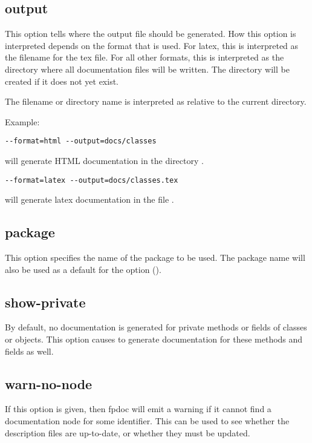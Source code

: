 \subsection{output}
\label{suse:output}
This option tells  \fpdoc where the output file should be generated. 
How this option is interpreted depends on the format that is used. 
For latex, this is interpreted as the filename for the tex file. 
For all other formats, this is interpreted as the directory where all 
documentation files will be written. The directory will be created if 
it does not yet exist.

The filename or directory name is interpreted as relative to the current
directory.

Example:
\begin{verbatim}
--format=html --output=docs/classes
\end{verbatim}
will generate HTML documentation in the directory .
\begin{verbatim}
--format=latex --output=docs/classes.tex
\end{verbatim}
will generate latex documentation in the file .

\subsection{package}
\label{suse:package}
This option specifies the name of the package to be used. The package name
will also be used as a default for the  option ().

\subsection{show-private}
\label{suse:showprivate}
By default, no documentation is generated for private methods or fields of
classes or objects. This option causes \fpdoc to generate documentation 
for these methods and fields as well.

\subsection{warn-no-node}
\label{suse:warnnonode}
If this option is given, then fpdoc will emit a warning if it cannot find a
documentation node for some identifier. This can be used to see whether the
description files are up-to-date, or whether they must be updated.

